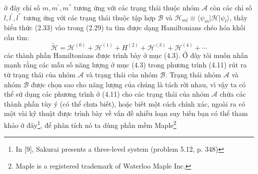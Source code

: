   ở đây chỉ số $m,m^{'},m^{''}$ tương ứng với các trạng thái thuộc nhóm $\mathcal{A}$ còn các chỉ số $l,l^{'},l^{''}$ tương ứng với các trạng thái thuộc tập hợp $\mathcal{B}$  và $\mathcal{H}_{ml}\equiv \langle \psi_m \vert \mathcal{H} \vert\psi_l\rangle$, thây biểu thức (2.33) vào trong (2.29) ta tìm được dạng Hamiltonians chéo hóa khối cần tìm:
  \begin{equation}
  \tilde{\mathcal{H}} = \mathcal{H}^{(0)}+\mathcal{H}^{(1)}+H^{(2)}+\mathcal{H}^{(3)}+\mathcal{H}^{(4)}+\cdots
  \end{equation} 
  các thành phần Hamiltonians được trình bày ở mục (4.3). Ở đây tôi muốn nhấn mạnh rằng các mẫu số năng lượng ở mục (4.3) trong phương trình (4.11) rút ra từ trạng thái của nhóm $\mathcal{A}$ và trạng thái của nhóm $\mathcal{B}$. Trạng thái nhóm  $\mathcal{A}$ và nhóm $\mathcal{B}$ được chọn sao cho năng lượng của chúng là tách rời nhau, vì vậy ta có thể sử dụng các phương trình ở (4.11) cho các trạng thái của nhóm $\mathcal{A}$ chứa các thành phần tùy ý (có thể chưa biết), hoặc biết một cách chính xác, ngoài ra có một vài kỹ thuật được trình bày về vấn đề nhiễu loạn suy biến bạn có thể tham khảo ở đây\protect\footnote{In [9], Sakurai presents a three-level system (problem 5.12, p. 348)}, để phân tích nó ta dùng phần mềm Maple\protect\footnote{Maple is a registered trademark of Waterloo Maple Inc.}
